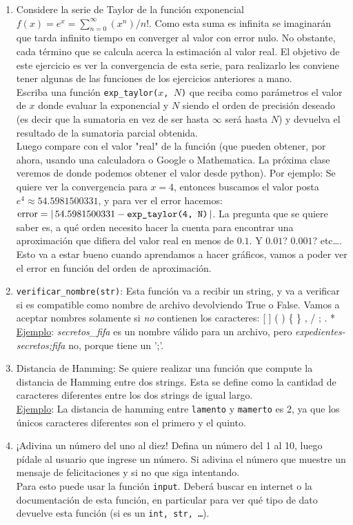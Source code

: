 \documentclass[a4paper]{article}
\begin{document}
\begin{enumerate}
\item Considere la serie de Taylor de la función exponencial $f(x)=e^x=\sum\limits_{n=0}^{\infty} (x^n) / n!$. Como esta suma es infinita se imaginarán que tarda infinito tiempo en converger al valor con error nulo. No obstante, cada término que se calcula acerca la estimación al valor real. El objetivo de este ejercicio es ver la convergencia de esta serie, para realizarlo les conviene tener algunas de las funciones de los ejercicios anteriores a mano.\\
	Escriba una función \texttt{exp\_taylor($x$, $N$)} que reciba como parámetros el valor de $x$ donde evaluar la exponencial y $N$ siendo el orden de precisión deseado (es decir que la sumatoria en vez de ser hasta $\infty$ será hasta $N$) y devuelva el resultado de la sumatoria parcial obtenida.\\
	Luego compare con el valor "real" de la función (que pueden obtener, por ahora, usando una calculadora o Google o Mathematica. La próxima clase veremos de donde podemos obtener el valor desde python). Por ejemplo: Se quiere ver la convergencia para $x=4$, entonces buscamos el valor posta $e^4 \approx 54.5981500331$, y para ver el error hacemos: $\textup{error} = |\,54.5981500331 - \texttt{exp\_taylor(4, N)}\,|$.
	La pregunta que se quiere saber es, a qué orden necesito hacer la cuenta para encontrar una aproximación que difiera del valor real en menos de $0.1$. Y $0.01$? $0.001$? etc\ldots.\\
	Esto va a estar bueno cuando aprendamos a hacer gráficos, vamos a poder ver el error en función del orden de aproximación.

\item \texttt{verificar\_nombre(str)}: Esta función va a recibir un string, y va a verificar si es compatible como nombre de archivo devolviendo True o False. Vamos a aceptar nombres solamente si \emph{no} contienen los caracteres: [ ] ( ) \{ \} , / ; . * \\
\underline{Ejemplo}: \textit{secretos\_fifa} es un nombre válido para un archivo, pero \textit{expedientes-secretos;fifa} no, porque tiene un ';'.

\item  Distancia de Hamming: Se quiere realizar una función que compute la distancia de Hamming entre dos strings. Esta se define como la cantidad de caracteres diferentes entre los dos strings de igual largo.\\
\underline{Ejemplo}: La distancia de hamming entre \texttt{lamento} y \texttt{mamerto} es 2, ya que los únicos caracteres diferentes son el primero y el quinto.

\item ¡Adivina un número del uno al diez! Defina un número del 1 al 10, luego pídale al usuario que ingrese un número. Si adivina el número que muestre un mensaje de felicitaciones y si no que siga intentando.\\
	Para esto puede usar la función \texttt{input}. Deberá buscar en internet o la documentación de esta función, en particular para ver qué tipo de dato devuelve esta función (si es un \texttt{int, str, \ldots}).
\end{enumerate}
\end{document}
